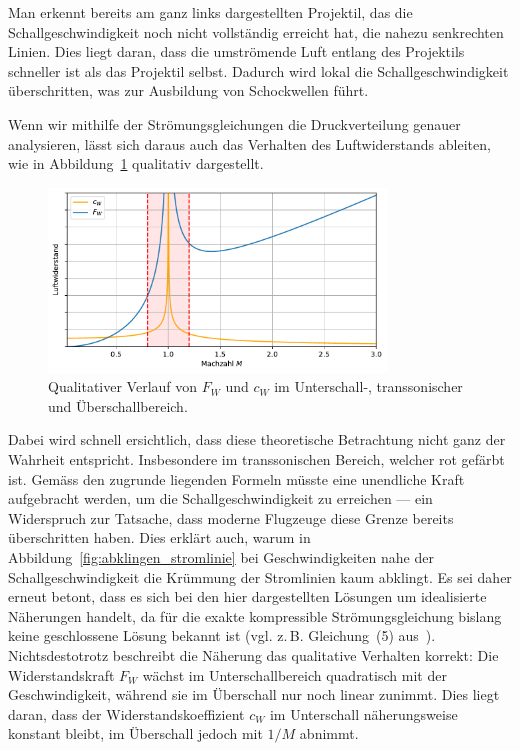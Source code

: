 Man erkennt bereits am ganz links dargestellten Projektil, 
das die Schallgeschwindigkeit noch nicht vollständig 
erreicht hat, die nahezu senkrechten Linien. 
Dies liegt daran, dass die umströmende Luft entlang 
des Projektils schneller ist als das Projektil selbst. 
Dadurch wird lokal die Schallgeschwindigkeit überschritten, 
was zur Ausbildung von Schockwellen führt.

Wenn wir mithilfe der Strömungsgleichungen die Druckverteilung genauer analysieren, 
lässt sich daraus auch das Verhalten des Luftwiderstands ableiten, 
wie in Abbildung~\ref{fig:luftwiderstand} qualitativ dargestellt.
\begin{figure}
    \centering
    \includegraphics[width=0.8\textwidth]{papers/ueberschall/figures/Luftwiderstand_qual.pdf}
    \caption{Qualitativer Verlauf von $F_W$ und $c_W$ im Unterschall-, transsonischer und Überschallbereich.}
    \label{fig:luftwiderstand}
\end{figure}
Dabei wird schnell ersichtlich, dass diese theoretische 
Betrachtung nicht ganz der Wahrheit entspricht.
Insbesondere im transsonischen Bereich, welcher rot gefärbt ist.
Gemäss den zugrunde liegenden Formeln müsste eine 
unendliche Kraft aufgebracht werden, 
um die Schallgeschwindigkeit zu erreichen — ein Widerspruch zur Tatsache, 
dass moderne Flugzeuge diese Grenze bereits überschritten haben.
Dies erklärt auch, warum in Abbildung~\ref{fig:abklingen_stromlinie} 
bei Geschwindigkeiten nahe der Schallgeschwindigkeit die Krümmung 
der Stromlinien kaum abklingt.
Es sei daher erneut betont, dass es sich bei den hier 
dargestellten Lösungen um idealisierte Näherungen handelt,
da für die exakte kompressible Strömungsgleichung bislang 
keine geschlossene Lösung bekannt ist 
(vgl. z.\,B. Gleichung~(5) aus~\cite{Ackeret1928}).
Nichtsdestotrotz beschreibt die Näherung das qualitative Verhalten korrekt:
Die Widerstandskraft $F_W$ wächst im Unterschallbereich quadratisch mit 
der Geschwindigkeit, während sie im Überschall nur noch linear zunimmt. 
Dies liegt daran, dass der Widerstandskoeffizient $c_W$ im Unterschall 
näherungsweise konstant bleibt, im Überschall 
jedoch mit $1/M$ abnimmt.

